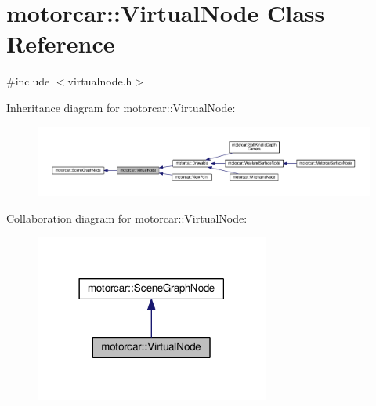 \hypertarget{classmotorcar_1_1VirtualNode}{\section{motorcar\-:\-:Virtual\-Node Class Reference}
\label{classmotorcar_1_1VirtualNode}
}


{\ttfamily \#include $<$virtualnode.\-h$>$}



Inheritance diagram for motorcar\-:\-:Virtual\-Node\-:
\nopagebreak
\begin{figure}[H]
\begin{center}
\leavevmode
\includegraphics[width=350pt]{classmotorcar_1_1VirtualNode__inherit__graph}
\end{center}
\end{figure}


Collaboration diagram for motorcar\-:\-:Virtual\-Node\-:
\nopagebreak
\begin{figure}[H]
\begin{center}
\leavevmode
\includegraphics[width=218pt]{classmotorcar_1_1VirtualNode__coll__graph}
\end{center}
\end{figure}
